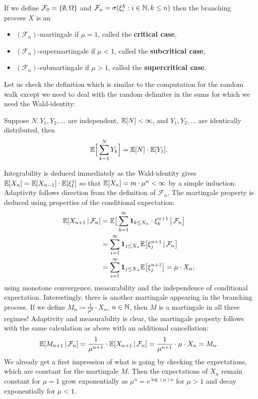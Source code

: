 \begin{example}
	 If we define $\mathcal{F}_0 = \lbrace \emptyset,\Omega \rbrace$ and $\mathcal{F}_n = \sigma(\xi_i^k: i\in \mathbb{N},k\leq n)$ then the branching process $X$ is an
			\begin{itemize}
				\item
					$(\mathcal F_n)$-martingale if $\mu=1$, called the \textbf{critical case},
				\item
					$(\mathcal F_n)$-supermartingale if $\mu<1$, called the \textbf{subcritical case},
				\item
					$(\mathcal F_n)$-submartingale if $\mu>1$, called the \textbf{supercritical case}.
			\end{itemize}
	Let us check the definition which is similar to the computation for the random walk except we need to deal with the random delimiter in the sums for which we need the Wald-identity:
	\begin{luebung}
		Suppose $N, Y_1,Y_2,...$ are independent, $\mathbb{E}[N]<\infty$, and $Y_1,Y_2,...$ are identically distributed, then
		\begin{align}\label{Wald}
			\mathbb{E}\Big[\sum_{k=1}^N Y_k\Big]=\mathbb{E}[N]\cdot \mathbb{E}[Y_1].
		\end{align}
	\end{luebung}
	Integrability is deduced immediately as the Wald-identity gives $\mathbb{E}[X_n]=\mathbb{E}[X_{n-1}]\cdot \mathbb{E}[\xi_1^1]$ so that $\mathbb{E}[X_n]=m\cdot\mu^{n}<\infty$ by a simple induction. Adaptivity follows direction from the definition of $\mathcal F_n$. The martingale property is deduced using properties of the conditional expectation:
			\begin{align*}
				\mathbb{E}[X_{n+1}\,|\,\mathcal{F}_n] &= \mathbb{E}\big[ \sum_{k=1}^{\infty}\mathbf 1_{k \leq X_n}\cdot \xi_k^{n+1}\,\big|\,\mathcal{F}_n\big] \\
										&=\sum_{i=1}^{\infty}\mathbf 1_{j \leq X_n} \mathbb{E}\big[\xi_j^{n+1}\,|\,\mathcal{F}_n\big] \\
										&=\sum_{i=1}^{\infty}\mathbf 1_{j \leq X_n} \mathbb{E}\big[\xi_j^{n+1}\big] 
										=\mu \cdot X_n,
			\end{align*}
			using monotone convergence, measurability and the independence of conditional expectation. Interestingly, there is another martingale appearing in the branching process. If we define $M_n \coloneqq \frac{1}{\mu^n}\cdot X_n$, $n\in\mathbb{N}$, then $M$ is a martingale in all three regimes! Adaptivity and measurability is clear, the martingale property follows with the same calculation as above with an additional cancellation:			
			$$ \mathbb{E}[M_{n+1}\,|\,\mathcal{F}_n] = \frac{1}{\mu^{n+1}}\cdot \mathbb{E}[X_{n+1}\,|\,\mathcal{F}_n] = \frac{1}{\mu^{n+1}} \cdot \mu \cdot X_n = M_n.$$
			We already get a first impression of what is going by checking the expectations, which are constant for the martingale $M$. Then the expectations of $X_n$ remain constant for $\mu=1$ grow exponentially as $\mu^n=e^{\log(\mu)n}$ for $\mu>1$ and decay exponentially for $\mu<1$.
		\end{example}
